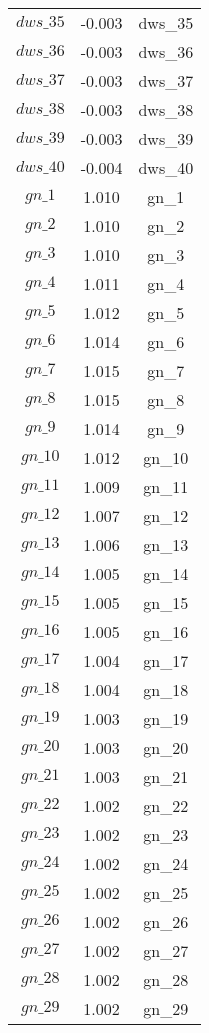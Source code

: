 \begin{center}
\begin{longtable}{ccc}
$dws\_35$ 	 & 	 -0.003 	 & 	 dws\_35\\
$dws\_36$ 	 & 	 -0.003 	 & 	 dws\_36\\
$dws\_37$ 	 & 	 -0.003 	 & 	 dws\_37\\
$dws\_38$ 	 & 	 -0.003 	 & 	 dws\_38\\
$dws\_39$ 	 & 	 -0.003 	 & 	 dws\_39\\
$dws\_40$ 	 & 	 -0.004 	 & 	 dws\_40\\
$gn\_1$ 	 & 	 1.010 	 & 	 gn\_1\\
$gn\_2$ 	 & 	 1.010 	 & 	 gn\_2\\
$gn\_3$ 	 & 	 1.010 	 & 	 gn\_3\\
$gn\_4$ 	 & 	 1.011 	 & 	 gn\_4\\
$gn\_5$ 	 & 	 1.012 	 & 	 gn\_5\\
$gn\_6$ 	 & 	 1.014 	 & 	 gn\_6\\
$gn\_7$ 	 & 	 1.015 	 & 	 gn\_7\\
$gn\_8$ 	 & 	 1.015 	 & 	 gn\_8\\
$gn\_9$ 	 & 	 1.014 	 & 	 gn\_9\\
$gn\_10$ 	 & 	 1.012 	 & 	 gn\_10\\
$gn\_11$ 	 & 	 1.009 	 & 	 gn\_11\\
$gn\_12$ 	 & 	 1.007 	 & 	 gn\_12\\
$gn\_13$ 	 & 	 1.006 	 & 	 gn\_13\\
$gn\_14$ 	 & 	 1.005 	 & 	 gn\_14\\
$gn\_15$ 	 & 	 1.005 	 & 	 gn\_15\\
$gn\_16$ 	 & 	 1.005 	 & 	 gn\_16\\
$gn\_17$ 	 & 	 1.004 	 & 	 gn\_17\\
$gn\_18$ 	 & 	 1.004 	 & 	 gn\_18\\
$gn\_19$ 	 & 	 1.003 	 & 	 gn\_19\\
$gn\_20$ 	 & 	 1.003 	 & 	 gn\_20\\
$gn\_21$ 	 & 	 1.003 	 & 	 gn\_21\\
$gn\_22$ 	 & 	 1.002 	 & 	 gn\_22\\
$gn\_23$ 	 & 	 1.002 	 & 	 gn\_23\\
$gn\_24$ 	 & 	 1.002 	 & 	 gn\_24\\
$gn\_25$ 	 & 	 1.002 	 & 	 gn\_25\\
$gn\_26$ 	 & 	 1.002 	 & 	 gn\_26\\
$gn\_27$ 	 & 	 1.002 	 & 	 gn\_27\\
$gn\_28$ 	 & 	 1.002 	 & 	 gn\_28\\
$gn\_29$ 	 & 	 1.002 	 & 	 gn\_29\\

\end{longtable}
\end{center}
